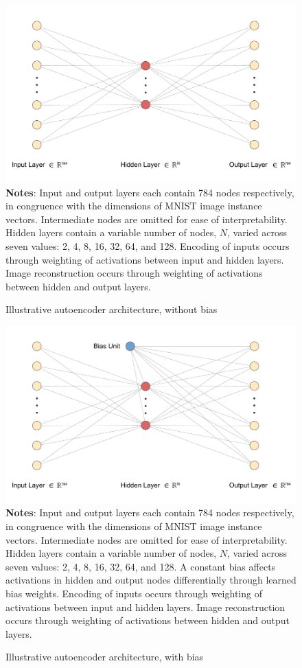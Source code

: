 \begin{figure}
    \caption{Illustrative autoencoder architecture, without bias}
	\label{fig:autoencoder-diagram}
	\includegraphics[width=1.0\textwidth]{graphics/autoencoder_diagram.pdf}
    \textbf{Notes}: Input and output layers each contain 784 nodes respectively, in congruence with the dimensions of MNIST image instance vectors. Intermediate nodes are omitted for ease of interpretability. Hidden layers contain a variable number of nodes, $N$, varied across seven values: 2, 4, 8, 16, 32, 64, and 128. Encoding of inputs occurs through weighting of activations between input and hidden layers. Image reconstruction occurs through weighting of activations between hidden and output layers.
\end{figure}

\begin{figure}
    \caption{Illustrative autoencoder architecture, with bias}
	\label{fig:autoencoder-diagram-bias}
	\includegraphics[width=1.0\textwidth]{graphics/autoencoder_diagram_bias.pdf}
    \textbf{Notes}: Input and output layers each contain 784 nodes respectively, in congruence with the dimensions of MNIST image instance vectors. Intermediate nodes are omitted for ease of interpretability. Hidden layers contain a variable number of nodes, $N$, varied across seven values: 2, 4, 8, 16, 32, 64, and 128. A  constant bias affects activations in hidden and output nodes differentially through learned bias weights. Encoding of inputs occurs through weighting of activations between input and hidden layers. Image reconstruction occurs through weighting of activations between hidden and output layers. 
\end{figure}

